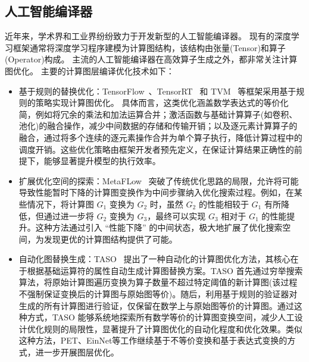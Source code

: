 \subsection{人工智能编译器}

近年来，学术界和工业界纷纷致力于开发新型的人工智能编译器。
现有的深度学习框架通常将深度学习程序建模为计算图结构，该结构由张量(Tensor)和算子(Operator)构成。
主流的人工智能编译器在高效算子生成之外，都非常关注计算图优化。
主要的计算图层编译优化技术如下：
\begin{itemize}
\item 基于规则的替换优化：TensorFlow~\cite{abadi2016tensorflow}、TensorRT~\cite{tensorrt} 和 TVM~\cite{chen2018tvm} 等框架采用基于规则的策略实现计算图优化。
具体而言，这类优化涵盖数学表达式的等价化简，例如将冗余的乘法和加法运算合并；激活函数与基础计算算子(如卷积、池化)的融合操作，减少中间数据的存储和传输开销；以及逐元素计算算子的融合，通过将多个连续的逐元素操作合并为单个算子执行，降低计算过程中的调度开销。这些优化策略由框架开发者预先定义，在保证计算结果正确性的前提下，能够显著提升模型的执行效率。
\item 扩展优化空间的探索：MetaFLow~\cite{MetaFlow} 突破了传统优化思路的局限，允许将可能导致性能暂时下降的计算图变换作为中间步骤纳入优化搜索过程。例如，在某些情况下，将计算图 $G_1$ 变换为 $G_2$ 时，虽然 $G_2$ 的性能相较于 $G_1$ 有所降低，但通过进一步将 $G_2$ 变换为 $G_3$，最终可以实现 $G_3$ 相对于 $G_1$ 的性能提升。这种方法通过引入 “性能下降” 的中间状态，极大地扩展了优化搜索空间，为发现更优的计算图结构提供了可能。
\item 自动化图替换生成：TASO~\cite{jia2019taso} 提出了一种自动化的计算图优化方法，其核心在于根据基础运算符的属性自动生成计算图替换方案。TASO 首先通过穷举搜索算法，将原始计算图遍历变换为算子数量不超过特定阈值的新计算图(该过程不强制保证变换后的计算图与原始图等价)。随后，利用基于规则的验证器对生成的所有计算图进行验证，仅保留在数学上与原始图等价的计算图。通过这种方式，TASO 能够系统地探索所有数学等价的计算图变换空间，减少人工设计优化规则的局限性，显著提升了计算图优化的自动化程度和优化效果。类似这种方法，PET\cite{wang2021pet}、EinNet\cite{zheng2023einnet}等工作继续基于不等价变换和基于表达式变换的方式，进一步开展图层优化。
\end{itemize}



